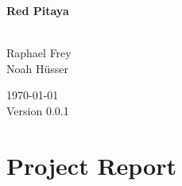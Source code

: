 \documentclass[a4paper,oneside]{alpenthesis/alpenthesis}
\begin{document}
\begin{titlingpage}
    \flushright\sffamily

    \vspace*{5em}
    \Huge\bfseries{Red Pitaya}\\[1ex]
    \Large{}\\[3ex]

    \normalsize\mdseries
    
    \vfill
    Raphael Frey\\
    Noah H\"usser\\[3ex]

    \vspace{5em}

    \today\\
    Version 0.0.1
\end{titlingpage} %

\frontmatter
\tableofcontents*
\clearpage
\listoffigures*
\clearpage
\listoftables*
\clearpage
\listoflistings
\clearpage

\mainmatter



\part{Project Report}
\label{part:project_report}
\end{document}

